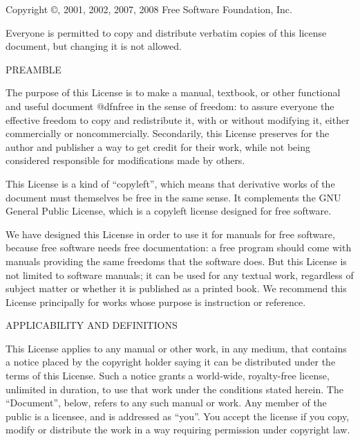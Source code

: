 
\blank

Copyright \copyright {}, 2001, 2002, 2007, 2008 Free Software Foundation, Inc. 

Everyone is permitted to copy and distribute verbatim copies of this license document, but changing it is not allowed.

\startitemize[n][start=0]
\item
PREAMBLE

The purpose of this License is to make a manual, textbook, or other functional and useful document @dfn{free} in the sense of freedom: to assure everyone the effective freedom to copy and redistribute it, with or without modifying it, either commercially or noncommercially. Secondarily, this License preserves for the author and publisher a way to get credit for their work, while not being considered responsible for modifications made by others. 

This License is a kind of ``copyleft'', which means that derivative works of the document must themselves be free in the same sense.  It complements the GNU General Public License, which is a copyleft license designed for free software.

We have designed this License in order to use it for manuals for free software, because free software needs free documentation: a free program should come with manuals providing the same freedoms that the software does.  But this License is not limited to software manuals; it can be used for any textual work, regardless of subject matter or whether it is published as a printed book.  We recommend this License principally for works whose purpose is instruction or reference.

\item
APPLICABILITY AND DEFINITIONS

This License applies to any manual or other work, in any medium, that contains a notice placed by the copyright holder saying it can be distributed under the terms of this License.  Such a notice grants a world-wide, royalty-free license, unlimited in duration, to use that work under the conditions stated herein.  The ``Document'', below, refers to any such manual or work.  Any member of the public is a licensee, and is addressed as ``you''.  You accept the license if you copy, modify or distribute the work in a way requiring permission under copyright law.

